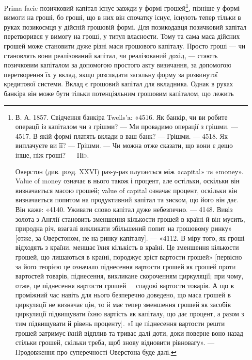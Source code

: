 Prima facie позичковий капітал існує завжди у формі грошей\footnote{
В. А. 1857. Свідчення банкіра Twells’a: «4516. Як банкір, чи ви робите операції із капіталом
чи з грішми? — Ми провадимо операції з грішми. — 4517. В якій формі платять вклади в ваш
банк? — Грішми. — 4518. Як виплачуєте ви її? — Грішми. — Чи можна отже сказати, що вони є дещо
інше, ніж гроші? — Ні».

Оверстон (див. розд. XXVI) раз-у-раз плутається між «capital» та «money». Value of money
означає в нього також і процент, але остільки, оскільки він визначається масою грошей; value of
capital означає процент, оскільки він визначається попитом на продуктивний капітал та зиском, що
його він
дає. Він каже: «4140. Уживати слово капітал дуже небезпечно. — 4148. Вивіз золота з Англії становить
зменшення кількости грошей в країні й він мусить, природна річ, взагалі викликати збільшений
попит на грошовому ринку» [отже, за Оверстоном, не на ринку капіталу]. — «4112. В міру того, як
гроші
відходять з країни, меншає їхня кількість в країні. Це зменшення кількости грошей, що лишаються в
країні, породжує зріст вартости грошей» [первісно за його теорією це означало піднесення вартости
грошей як грошей проти вартостей товарів, піднесення, викликане скороченням циркуляції; при чому,
отже, це піднесення вартости грошей = спадові вартости товарів. А що в проміжний час навіть для
нього безперечно
доведено, що маса грошей в циркуляції не визначає цін, то й має тепер зменшення грошей як
засобів циркуляції підвищувати їхню вартість як капіталу, що дає процент, а разом з тим підвищувати
й рівень проценту]. «І це піднесення вартости решти грошей затримує їхній відплив та триває далі
доти, доки поверне воно назад стільки грошей, скільки треба, щоб знову відновити рівновагу». —
Продовження
про суперечності Оверстона буде далі.
}, пізніше
у формі вимоги на гроші, бо гроші, що в них він спочатку існує, існують тепер
тільки в руках позикоємця у дійсній грошовій формі. Для позикодавця позичковий
капітал перетворився у вимогу на гроші, у титул власности. Тому та сама маса
дійсних грошей може становити дуже різні маси грошового капіталу. Просто
гроші — чи становлять вони реалізований капітал, чи реалізований дохід, —
стають позичковим капіталом за допомогою простого акту визичання, за допомогою
перетворення їх у вклад, якщо розглядати загальну форму за розвинутої
кредитової системи. Вклад є грошовий капітал для вкладника. Однак в руках
банкіра він може бути тільки потенціяльним грошовим капіталом, що лежить
